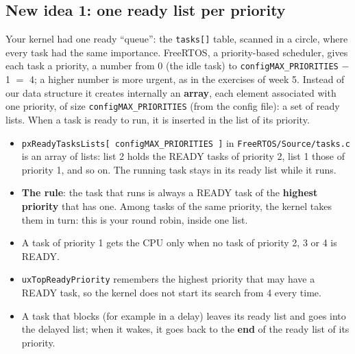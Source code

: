 \subsection{New idea 1: one ready list per priority}
Your kernel had one ready ``queue'': the \texttt{tasks[]} table, scanned in a circle, where every task had the same importance. FreeRTOS, a priority-based scheduler, gives each task a priority, a number from 0 (the idle task) to \texttt{configMAX\_PRIORITIES} $-$ 1 $=$ 4; a higher number is more urgent, as in the exercises of week 5. Instead of our data structure it creates internally an \textbf{array}, each element associated with one priority, of size \texttt{configMAX\_PRIORITIES} (from the config file): a set of ready lists. When a task is ready to run, it is inserted in the list of its priority.
\begin{itemize}
    \item \texttt{pxReadyTasksLists[ configMAX\_PRIORITIES ]} in \texttt{FreeRTOS/Source/tasks.c} is an array of lists: list 2 holds the READY tasks of priority 2, list 1 those of priority 1, and so on. The running task stays in its ready list while it runs.
    \item \textbf{The rule}: the task that runs is always a READY task of the \textbf{highest priority} that has one. Among tasks of the same priority, the kernel takes them in turn: this is your round robin, inside one list.
    \item A task of priority 1 gets the CPU only when no task of priority 2, 3 or 4 is READY.
    \item \texttt{uxTopReadyPriority} remembers the highest priority that may have a READY task, so the kernel does not start its search from 4 every time.
    \item A task that blocks (for example in a delay) leaves its ready list and goes into the delayed list; when it wakes, it goes back to the \textbf{end} of the ready list of its priority.
\end{itemize}

